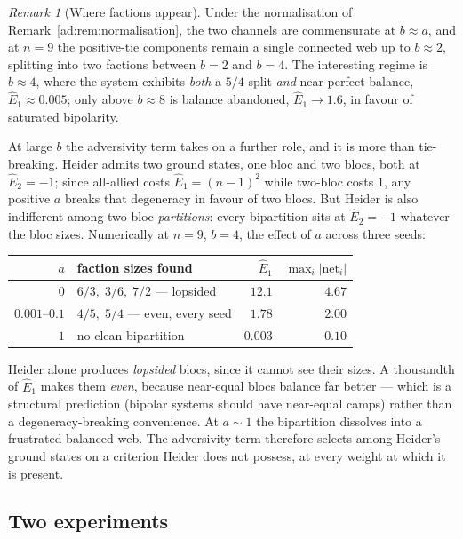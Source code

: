 \documentclass[11pt]{article}
\numberwithin{equation}{section}
\theoremstyle{plain}
\theoremstyle{definition}
\theoremstyle{remark}
\newtheorem{remark}[theorem]{Remark}
\begin{document}
\begin{remark}[Where factions appear]\label{ad:rem:factions}
Under the normalisation of Remark~\ref{ad:rem:normalisation}, the two
channels are commensurate at $b\approx a$, and at $n=9$ the positive-tie
components remain a single connected web up to $b\approx2$, splitting
into two factions between $b=2$ and $b=4$. The interesting regime is
$b\approx4$, where the system exhibits \emph{both} a $5/4$ split
\emph{and} near-perfect balance, $\hat E_1\approx0.005$; only above
$b\approx8$ is balance abandoned, $\hat E_1\to1.6$, in favour of
saturated bipolarity.

At large $b$ the adversivity term takes on a further role, and it is
more than tie-breaking. Heider admits two ground states, one bloc and
two blocs, both at $\hat E_2=-1$; since all-allied costs
$\hat E_1=(n-1)^{2}$ while two-bloc costs $1$, any positive $a$ breaks
that degeneracy in favour of two blocs. But Heider is also indifferent
among two-bloc \emph{partitions}: every bipartition sits at $\hat E_2=
-1$ whatever the bloc sizes. Numerically at $n=9$, $b=4$, the effect of
$a$ across three seeds:
\begin{center}\small
\begin{tabular}{@{}rlrr@{}}
\toprule
$a$ & faction sizes found & $\hat E_1$ & $\max_i|\mathrm{net}_i|$\\
\midrule
$0$ & $6/3,\;3/6,\;7/2$ --- lopsided & $12.1$ & $4.67$\\
$0.001$--$0.1$ & $4/5,\;5/4$ --- even, every seed & $1.78$ & $2.00$\\
$1$ & no clean bipartition & $0.003$ & $0.10$\\
\bottomrule
\end{tabular}
\end{center}
Heider alone produces \emph{lopsided} blocs, since it cannot see their
sizes. A thousandth of $\hat E_1$ makes them \emph{even}, because
near-equal blocs balance far better --- which is a structural prediction
(bipolar systems should have near-equal camps) rather than a
degeneracy-breaking convenience. At $a\sim1$ the bipartition dissolves
into a frustrated balanced web. The adversivity term therefore selects
among Heider's ground states on a criterion Heider does not possess, at
every weight at which it is present.
\end{remark}

\subsection{Two experiments}\label{ad:sub:experiments}
\end{document}
